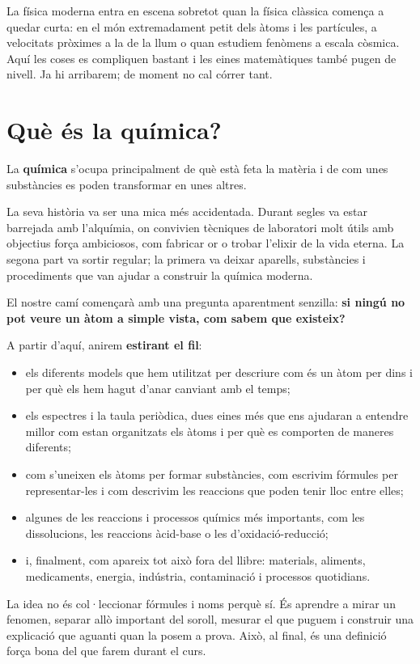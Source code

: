 La física moderna entra en escena sobretot quan la física clàssica comença a quedar curta: en el món extremadament petit dels àtoms i les partícules, a velocitats pròximes a la de la llum o quan estudiem fenòmens a escala còsmica. Aquí les coses es compliquen bastant i les eines matemàtiques també pugen de nivell. Ja hi arribarem; de moment no cal córrer tant.

\section{Què és la química?}

La \textbf{química} s’ocupa principalment de què està feta la matèria i de com unes substàncies es poden transformar en unes altres.

La seva història va ser una mica més accidentada. Durant segles va estar barrejada amb l’alquímia, on convivien tècniques de laboratori molt útils amb objectius força ambiciosos, com fabricar or o trobar l’elixir de la vida eterna. La segona part va sortir regular; la primera va deixar aparells, substàncies i procediments que van ajudar a construir la química moderna.

El nostre camí començarà amb una pregunta aparentment senzilla: \textbf{si ningú no pot veure un àtom a simple vista, com sabem que existeix?}

A partir d’aquí, anirem \textbf{estirant el fil}:

\begin{itemize}
    \item els diferents models que hem utilitzat per descriure com és un àtom per dins i per què els hem hagut d’anar canviant amb el temps;
    \item els espectres i la taula periòdica, dues eines més que ens ajudaran a entendre millor com estan organitzats els àtoms i per què es comporten de maneres diferents;
    \item com s’uneixen els àtoms per formar substàncies, com escrivim fórmules per representar-les i com descrivim les reaccions que poden tenir lloc entre elles;
    \item algunes de les reaccions i processos químics més importants, com les dissolucions, les reaccions àcid-base o les d’oxidació-reducció;
    \item i, finalment, com apareix tot això fora del llibre: materials, aliments, medicaments, energia, indústria, contaminació i processos quotidians.
\end{itemize}
La idea no és col·leccionar fórmules i noms perquè sí. És aprendre a mirar un fenomen, separar allò important del soroll, mesurar el que puguem i construir una explicació que aguanti quan la posem a prova. Això, al final, és una definició força bona del que farem durant el curs.

